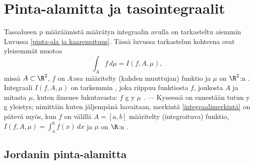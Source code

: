 \section{Pinta-alamitta ja tasointegraalit} \label{tasointegraalit}
\alku {}

Tasoalueen p määräämistä määrätyn integraalin avulla on tarkasteltu aiemmin
Luvussa \ref{pinta-ala ja kaarenpituus}. Tässä luvussa tarkastelun kohteena ovat yleisemmät
 muotoa
\begin{equation} \label{integraalimerkintä}
\int_A f\, d\mu=I(f,A,\mu), \tag{$\star$}
\end{equation}
missä $A\subset\R^2$, $f$ on $A$:ssa määritelty (kahden muuttujan) funktio ja $\mu$ on $\R^2$:n
. Integraali $I(f,A,\mu)$ on tarkemmin ,
joka riippuu funktiosta $f$, joukosta $A$ ja mitasta $\mu$, kuten ilmenee lukutavasta:
$f$ g y   $\mu$
. --- Kyseessä on ennestään tutun y g
yleistys; nimittäin kuten jäljempänä havaitaan, merkintä \eqref{integraalimerkintä} on pätevä
myös, kun $f$ on välillä $A=[a,b]$ määritelty (integroituva) funktio,
$I(f,A,\mu)=\int_a^b f(x)\,dx$ ja $\mu$ on $\R$:n .

\subsection{Jordanin pinta-alamitta}

